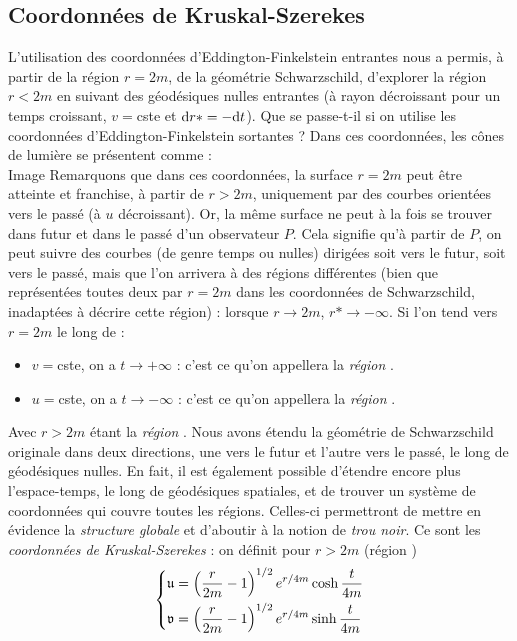 \subsection{Coordonnées de Kruskal-Szerekes}
L'utilisation des coordonnées d'Eddington-Finkelstein entrantes nous a permis, à partir de la région $r=2m$, de la géométrie Schwarzschild, d'explorer la région $r<2m$ en suivant des géodésiques nulles entrantes (à rayon décroissant pour un temps croissant, $v =$cste et $\mathrm{d} r* = - \mathrm{d} t$). Que se passe-t-il si on utilise les coordonnées d'Eddington-Finkelstein sortantes ? Dans ces coordonnées, les cônes de lumière se présentent comme :\\
Image
Remarquons que dans ces coordonnées, la surface $r=2m$ peut être atteinte et franchise, à partir de $r>2m$, uniquement par des courbes orientées vers le passé (à $u$ décroissant). Or, la même surface ne peut à la fois se trouver dans futur et dans le passé d'un observateur $P$. Cela signifie qu'à partir de $P$, on peut suivre des courbes (de genre temps ou nulles) dirigées soit vers le futur, soit vers le passé, mais que l'on arrivera à des régions différentes (bien que représentées toutes deux par $r=2m$ dans les coordonnées de Schwarzschild, inadaptées à décrire cette région) : lorsque $r\to 2m$, $r* \to - \infty$. Si l'on tend vers $r=2m$ le long de :
\begin{itemize}
    \item $v = $cste, on a $t \to + \infty$ : c'est ce qu'on appellera la \emph{région} .
    \item $u = $cste, on a $t \to - \infty$ : c'est ce qu'on appellera la \emph{région} .
\end{itemize}
Avec $r>2m$ étant la \emph{région} . Nous avons étendu la géométrie de Schwarzschild originale dans deux directions, une vers le futur et l'autre vers le passé, le long de géodésiques nulles. En fait, il est également possible d'étendre encore plus l'espace-temps, le long de géodésiques spatiales, et de trouver un système de coordonnées qui couvre toutes les régions. Celles-ci permettront de mettre en évidence la \emph{structure globale} et d'aboutir à la notion de \emph{trou noir}. Ce sont les \emph{coordonnées de Kruskal-Szerekes} : on définit pour $r>2m$ (région )
\begin{align}
    \label{coordonnées KS 1}
    \begin{dcases}
        \mathfrak{u} = \left( \frac{r}{2m} -1 \right)^{1/2} e^{r/4m} \cosh \frac{t}{4m}\\
        \mathfrak{v} = \left( \frac{r}{2m} -1 \right)^{1/2} e^{r/4m} \sinh \frac{t}{4m}
    \end{dcases}
\end{align}
